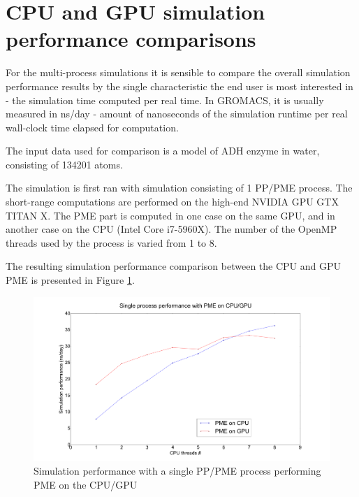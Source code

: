 \documentclass[12pt,a4paper,notitlepage]{report}
\begin{document}


\section{CPU and GPU simulation performance comparisons}

For the multi-process simulations it is sensible to compare the overall simulation performance results by the single characteristic the end user is most interested in - the simulation time computed per real time. In GROMACS, it is usually measured in ns/day - amount of nanoseconds of the simulation runtime per real wall-clock time elapsed for computation.

The input data used for comparison is a model of ADH enzyme in water, consisting of 134201 atoms.

The simulation is first ran with simulation consisting of 1 PP/PME process. The short-range computations are performed on the high-end NVIDIA GPU GTX TITAN X.    
The PME part is computed in one case on the same GPU, and in another case on the CPU (Intel Core i7-5960X). The number of the OpenMP threads used by the process is varied from 1 to 8.
 
The resulting simulation performance comparison between the CPU and GPU PME is presented in Figure \ref{fig:sepGPUold}.
 
\FloatBarrier
\begin{figure} [h!]
    \centering
    \includegraphics[width=1\textwidth]{pics/CPU_GPU_ADH_SINGLE.png}
    \caption{Simulation performance with a single PP/PME process performing PME on the CPU/GPU}
    \label{fig:sepGPUold}
\end{figure}
\FloatBarrier
\end{document}
